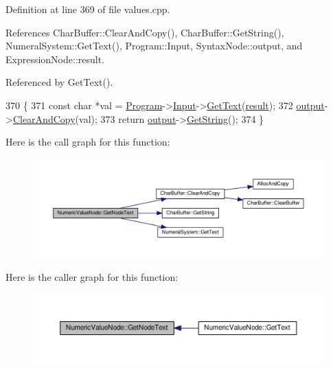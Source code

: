 Definition at line 369 of file values.\+cpp.



References Char\+Buffer\+::\+Clear\+And\+Copy(), Char\+Buffer\+::\+Get\+String(), Numeral\+System\+::\+Get\+Text(), Program\+::\+Input, Syntax\+Node\+::output, and Expression\+Node\+::result.



Referenced by Get\+Text().


\begin{DoxyCode}
370 \{
371     \textcolor{keyword}{const} \textcolor{keywordtype}{char} *val = \hyperlink{classProgram}{Program}->\hyperlink{classProgram_a6327f15962926e4f74f15e8ff56e04e5}{Input}->\hyperlink{classNumeralSystem_a74dc91c4dbab4a88a123b2a32753f485}{GetText}(\hyperlink{classExpressionNode_a1f590649f5a5cb30eb7ee912f7bc1262}{result});
372     \hyperlink{classSyntaxNode_a1180628cbe3fce43930cee0df5a9ce5c}{output}->\hyperlink{classCharBuffer_ac52ed7b91190240eb7db4cf43d1e2abb}{ClearAndCopy}(val);
373     \textcolor{keywordflow}{return} \hyperlink{classSyntaxNode_a1180628cbe3fce43930cee0df5a9ce5c}{output}->\hyperlink{classCharBuffer_a7dfd3feaaf80f318ba44efe15b1ec44b}{GetString}();
374 \}
\end{DoxyCode}


Here is the call graph for this function\+:\nopagebreak
\begin{figure}[H]
\begin{center}
\leavevmode
\includegraphics[width=350pt]{classNumericValueNode_a078bf8f0496d2afcb7e3a050110a0c0d_cgraph}
\end{center}
\end{figure}




Here is the caller graph for this function\+:\nopagebreak
\begin{figure}[H]
\begin{center}
\leavevmode
\includegraphics[width=350pt]{classNumericValueNode_a078bf8f0496d2afcb7e3a050110a0c0d_icgraph}
\end{center}
\end{figure}


